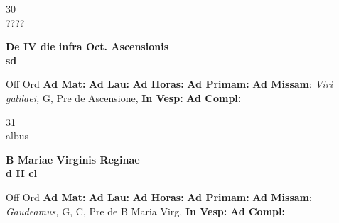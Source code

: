 \documentclass[10pt, openany]{book}
\begin{document}
    \begin{center}
        \begin{minipage}{3.5in}
            \vspace{2em}
            \begin{minipage}{0.5in}
                {\Huge 30} \\
                {\normalsize ????}
            \end{minipage}
            \begin{minipage}{3.0in}
                \textbf{ \large De IV die infra Oct. Ascensionis \\
                \textnormal{\normalsize sd}}

            \end{minipage}
            \begin{justify}Off Ord
                \textbf{Ad Mat: }
                \textbf{Ad Lau: }
                \textbf{Ad Horas: }
                \textbf{Ad Primam: }\textbf{Ad Missam}: \textit{Viri galilaei,} G, Pre de Ascensione, 
                \textbf{In Vesp: }
                \textbf{Ad Compl: }
            \end{justify}
        \end{minipage}
    \end{center}

    \begin{center}
        \begin{minipage}{3.5in}
            \vspace{2em}
            \begin{minipage}{0.5in}
                {\Huge 31} \\
                {\normalsize albus}
            \end{minipage}
            \begin{minipage}{3.0in}
                \textbf{ \large B Mariae Virginis Reginae \\
                \textnormal{\normalsize d II cl}}

            \end{minipage}
            \begin{justify}Off Ord
                \textbf{Ad Mat: }
                \textbf{Ad Lau: }
                \textbf{Ad Horas: }
                \textbf{Ad Primam: }\textbf{Ad Missam}: \textit{Gaudeamus,} G, C, Pre de B Maria Virg, 
                \textbf{In Vesp: }
                \textbf{Ad Compl: }
            \end{justify}
        \end{minipage}
    \end{center}
\end{document}
